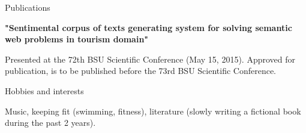 \documentclass{resume} %
\begin{document}
\begin{rSection}{Publications}

{\bf "Sentimental corpus of texts generating system for solving semantic web problems in tourism domain"}

Presented at the 72th BSU Scientific Conference (May 15, 2015). Approved for publication, is to be published before the 73rd BSU Scientific Conference.

\end{rSection}


\begin{rSection}{Hobbies and interests}

Music, keeping fit (swimming, fitness), literature (slowly writing a fictional book during the past 2 years).

\end{rSection}





\end{document}
